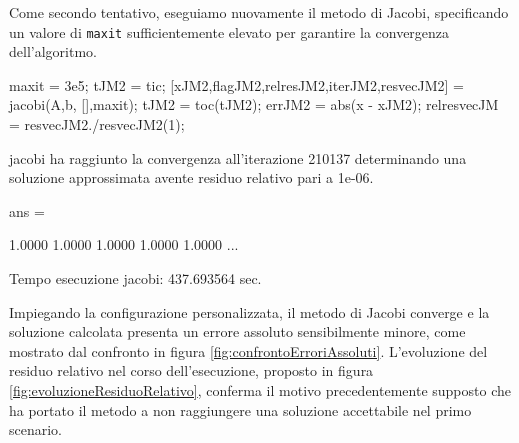     Come secondo tentativo, eseguiamo nuovamente il metodo di Jacobi, specificando un valore di \lstinline{maxit} sufficientemente elevato per garantire la
    convergenza dell'algoritmo.
    \begin{matlabcode}
    maxit = 3e5;
    tJM2 = tic;
    [xJM2,flagJM2,relresJM2,iterJM2,resvecJM2] = jacobi(A,b,
                                                 [],maxit);
    tJM2 = toc(tJM2);
    errJM2 = abs(x - xJM2);
    relresvecJM = resvecJM2./resvecJM2(1);
    \end{matlabcode}
    \begin{matlaboutput}
    jacobi ha raggiunto la convergenza all'iterazione 210137
    determinando una soluzione approssimata avente residuo
    relativo pari a 1e-06.

    ans =

    1.0000    1.0000    1.0000    1.0000    1.0000    ...
    \end{matlaboutput}
    \begin{matlaboutput}
    Tempo esecuzione jacobi: 437.693564 sec.
    \end{matlaboutput}
    Impiegando la configurazione personalizzata, il metodo di Jacobi converge e la soluzione calcolata presenta un errore assoluto sensibilmente minore, come
    mostrato dal confronto in figura \ref{fig:confrontoErroriAssoluti}.\newline
    L'evoluzione del residuo relativo nel corso dell'esecuzione, proposto in figura \ref{fig:evoluzioneResiduoRelativo}, conferma il motivo precedentemente supposto che ha portato il metodo a non raggiungere
    una soluzione accettabile nel primo scenario.


